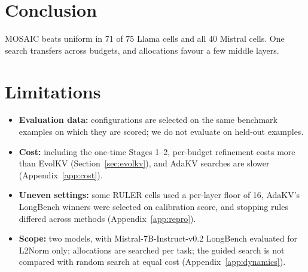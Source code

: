 \documentclass[11pt]{article}
\begin{document}
\FloatBarrier
\section{Conclusion}

MOSAIC beats uniform in 71 of 75 Llama cells and all 40 Mistral cells. One search transfers across budgets, and allocations favour a few middle layers.

\clearpage
\section*{Limitations}

\begin{itemize}
\item \textbf{Evaluation data:} configurations are selected on the same benchmark examples on which they are scored; we do not evaluate on held-out examples.
\item \textbf{Cost:} including the one-time Stages 1--2, per-budget refinement costs more than EvolKV (Section~\ref{sec:evolkv}), and AdaKV searches are slower (Appendix~\ref{app:cost}).
\item \textbf{Uneven settings:} some RULER cells used a per-layer floor of 16, AdaKV's LongBench winners were selected on calibration score, and stopping rules differed across methods (Appendix~\ref{app:repro}).
\item \textbf{Scope:} two models, with Mistral-7B-Instruct-v0.2 LongBench evaluated for L2Norm only; allocations are searched per task; the guided search is not compared with random search at equal cost (Appendix~\ref{app:dynamics}).
\end{itemize}

\FloatBarrier




\end{document}
